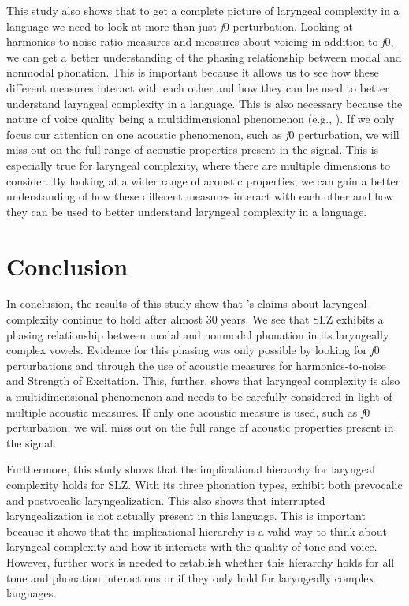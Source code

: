 This study also shows that to get a complete picture of laryngeal complexity in a language we need to look at more than just \textit{f}0 perturbation. Looking at harmonics-to-noise ratio measures and measures about voicing in addition to \textit{f}0, we can get a better understanding of the phasing relationship between modal and nonmodal phonation. This is important because it allows us to see how these different measures interact with each other and how they can be used to better understand laryngeal complexity in a language. This is also necessary because the nature of voice quality being a multidimensional phenomenon (e.g., \cite{kreimanUnifiedTheoryVoice2014,kreimanValidatingPsychoacousticModel2021}). If we only focus our attention on one acoustic phenomenon, such as \textit{f}0 perturbation, we will miss out on the full range of acoustic properties present in the signal. This is especially true for laryngeal complexity, where there are multiple dimensions to consider. By looking at a wider range of acoustic properties, we can gain a better understanding of how these different measures interact with each other and how they can be used to better understand laryngeal complexity in a language.

\section{Conclusion}\label{sec:conclusion_of_lc}

In conclusion, the results of this study show that \citeauthor{silvermanLaryngealComplexityOtomanguean1997}'s \citeyear{silvermanLaryngealComplexityOtomanguean1997} claims about laryngeal complexity continue to hold after almost 30 years. We see that SLZ exhibits a phasing relationship between modal and nonmodal phonation in its laryngeally complex vowels. Evidence for this phasing was only possible by looking for \textit{f}0 perturbations and through the use of acoustic measures for harmonics-to-noise and Strength of Excitation. This, further, shows that laryngeal complexity is also a multidimensional phenomenon and needs to be carefully considered in light of multiple acoustic measures. If only one acoustic measure is used, such as \textit{f}0 perturbation, we will miss out on the full range of acoustic properties present in the signal. 

Furthermore, this study shows that the implicational hierarchy for laryngeal complexity holds for SLZ. With its three phonation types, exhibit both prevocalic and postvocalic laryngealization. This also shows that interrupted laryngealization is not actually present in this language. This is important because it shows that the implicational hierarchy is a valid way to think about laryngeal complexity and how it interacts with the quality of tone and voice. However, further work is needed to establish whether this hierarchy holds for all tone and phonation interactions or if they only hold for laryngeally complex languages. 